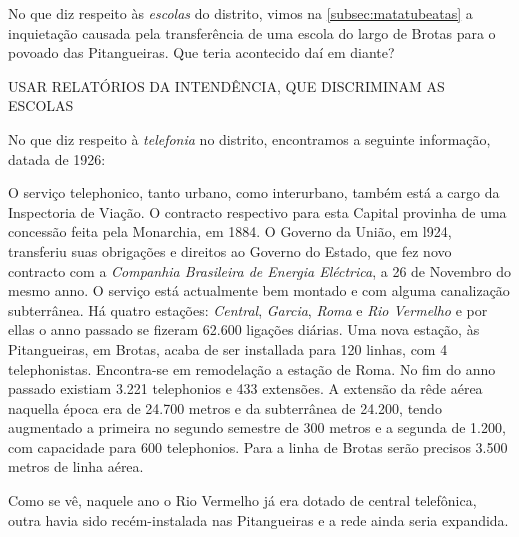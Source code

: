 No que diz respeito às \textit{escolas} do distrito, vimos na \autoref{subsec:matatubeatas} a inquietação causada pela transferência de uma escola do largo de Brotas para o povoado das Pitangueiras. Que teria acontecido daí em diante?



USAR RELATÓRIOS DA INTENDÊNCIA, QUE DISCRIMINAM AS ESCOLAS

No que diz respeito à \textit{telefonia} no distrito, encontramos a seguinte informação, datada de 1926:

\begin{citacao}
O serviço telephonico, tanto urbano, como interurbano, também está a cargo da Inspectoria de Viação.
O contracto respectivo para esta Capital provinha de uma concessão feita pela Monarchia, em 1884.
O Governo da União, em l924, transferiu suas obrigações e direitos ao Governo do Estado, que fez novo contracto com a \textit{Companhia Brasileira de Energia Eléctrica}, a 26 de Novembro do mesmo anno.
O serviço está actualmente bem montado e com alguma canalização subterrânea.
Há quatro estações: \textit{Central}, \textit{Garcia}, \textit{Roma} e \textit{Rio Vermelho} e por ellas o anno passado se fizeram 62.600 ligações diárias.
Uma nova estação, às Pitangueiras, em Brotas, acaba de ser installada para 120 linhas, com 4 telephonistas.
Encontra-se em remodelação a estação de Roma.
No fim do anno passado existiam 3.221 telephonios e 433 extensões.
A extensão da rêde aérea naquella época era de 24.700 metros e da subterrânea de 24.200, tendo augmentado a primeira no segundo semestre de 300 metros e a segunda
de 1.200, com capacidade para 600 telephonios.
Para a linha de Brotas serão precisos 3.500 metros de linha aérea. \cite[pp.~266-267]{bahia_rpe_1926}
\end{citacao}

Como se vê, naquele ano o Rio Vermelho já era dotado de central telefônica, outra havia sido recém-instalada nas Pitangueiras e a rede ainda seria expandida.